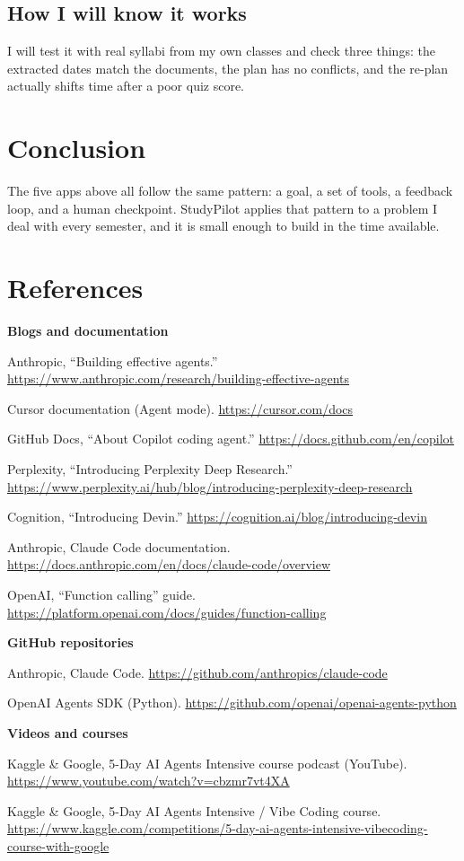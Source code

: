 \documentclass[11pt]{article}
\begin{document}
\subsection{How I will know it works}
I will test it with real syllabi from my own classes and check three things: the
extracted dates match the documents, the plan has no conflicts, and the re-plan
actually shifts time after a poor quiz score.

\section{Conclusion}
The five apps above all follow the same pattern: a goal, a set of tools, a feedback
loop, and a human checkpoint. StudyPilot applies that pattern to a problem I deal
with every semester, and it is small enough to build in the time available.

\section*{References}
\small
\textbf{Blogs and documentation}
\begin{enumerate}[label={[\arabic*]}]
  \item Anthropic, ``Building effective agents.''
        \url{https://www.anthropic.com/research/building-effective-agents}
  \item Cursor documentation (Agent mode). \url{https://cursor.com/docs}
  \item GitHub Docs, ``About Copilot coding agent.''
        \url{https://docs.github.com/en/copilot}
  \item Perplexity, ``Introducing Perplexity Deep Research.''
        \url{https://www.perplexity.ai/hub/blog/introducing-perplexity-deep-research}
  \item Cognition, ``Introducing Devin.'' \url{https://cognition.ai/blog/introducing-devin}
  \item Anthropic, Claude Code documentation.
        \url{https://docs.anthropic.com/en/docs/claude-code/overview}
  \item OpenAI, ``Function calling'' guide.
        \url{https://platform.openai.com/docs/guides/function-calling}
\end{enumerate}
\textbf{GitHub repositories}
\begin{enumerate}[label={[\arabic*]}, resume]
  \item Anthropic, Claude Code. \url{https://github.com/anthropics/claude-code}
  \item OpenAI Agents SDK (Python). \url{https://github.com/openai/openai-agents-python}
\end{enumerate}
\textbf{Videos and courses}
\begin{enumerate}[label={[\arabic*]}, resume]
  \item Kaggle \& Google, 5-Day AI Agents Intensive course podcast (YouTube).
        \url{https://www.youtube.com/watch?v=cbzmr7vt4XA}
  \item Kaggle \& Google, 5-Day AI Agents Intensive / Vibe Coding course.
        \url{https://www.kaggle.com/competitions/5-day-ai-agents-intensive-vibecoding-course-with-google}
\end{enumerate}
\end{document}
